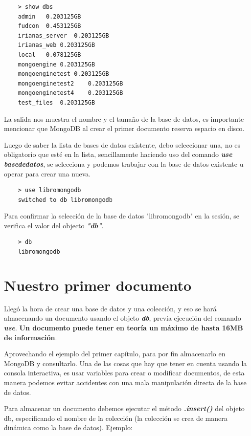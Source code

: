\begin{lstlisting}
    > show dbs
    admin	0.203125GB
    fudcon	0.453125GB
    irianas_server	0.203125GB
    irianas_web	0.203125GB
    local	0.078125GB
    mongoengine	0.203125GB
    mongoenginetest	0.203125GB
    mongoenginetest2	0.203125GB
    mongoenginetest4	0.203125GB
    test_files	0.203125GB
\end{lstlisting}

La salida nos muestra el nombre y el tama\~no de la base de datos, es importante mencionar que MongoDB al crear el primer documento reserva espacio en disco.

Luego de saber la lista de bases de datos existente, debo seleccionar una, no es obligatorio que est\'e en la lista, sencillamente haciendo uso del comando \textit{\textbf{use basededatos}}, se selecciona y podemos trabajar con la base de datos existente u operar para crear una nueva.

\begin{lstlisting}
    > use libromongodb
    switched to db libromongodb
\end{lstlisting}

Para confirmar la selecci\'on de la base de datos "libromongodb" en la sesi\'on, se verifica el valor del objecto \textit{\textbf{"db"}}.

\begin{lstlisting}
    > db
    libromongodb
\end{lstlisting}

\section{Nuestro primer documento}

Lleg\'o la hora de crear una base de datos y una colecci\'on, y eso se har\'a almacenando un documento usando el objeto \textit{\textbf{db}}, previa ejecuci\'on del comando \textit{\textbf{use}}. \textbf{Un documento puede tener en teor\'ia un m\'aximo de hasta 16MB de informaci\'on}. 

Aprovechando el ejemplo del primer cap\'itulo, para por fin almacenarlo en MongoDB y consultarlo. Una de las cosas que hay que tener en cuenta usando la consola interactiva, es usar variables para crear o modificar documentos, de esta manera podemos evitar accidentes con una mala manipulaci\'on directa de la base de datos.

Para almacenar un documento debemos ejecutar el m\'etodo \textit{\textbf{.insert()}} del objeto db, especificando el nombre de la colecci\'on (la colecci\'on se crea de manera din\'amica como la base de datos). Ejemplo:

